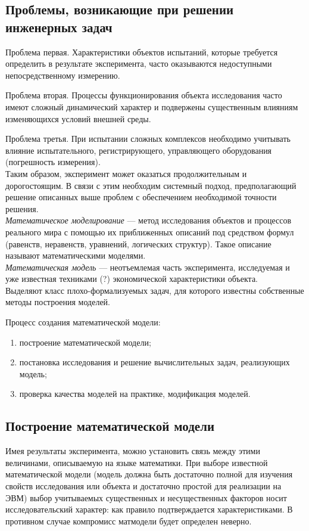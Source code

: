 \documentclass[12pt]{article}
\begin{document}
\subsection{Проблемы, возникающие при решении инженерных задач}
Проблема первая. Характеристики объектов испытаний, которые требуется определить в результате эксперимента, часто оказываются недоступными непосредственному измерению.

Проблема вторая. Процессы функционирования объекта исследования часто имеют сложный динамический характер и подвержены существенным влияниям изменяющихся условий внешней среды.

Проблема третья. При испытании сложных комплексов необходимо учитывать влияние испытательного, регистрирующего, управляющего оборудования (погрешность измерения).\\

Таким образом, эксперимент может оказаться продолжительным и дорогостоящим. В связи с этим необходим системный подход, предполагающий решение описанных выше проблем с обеспечением необходимой точности решения.\\

\emph{Математическое моделирование} --- метод исследования объектов и процессов реального мира с помощью их приближенных описаний под средством формул (равенств, неравенств, уравнений, логических структур). Такое описание называют математическими моделями.\\

\emph{Математическая модель} --- неотъемлемая часть эксперимента, исследуемая и уже известная техниками (?)  экономической характеристики объекта.\\

Выделяют класс плохо-формализуемых задач, для которого известны собственные методы построения моделей.

Процесс создания математической модели:
\begin{enumerate}
    \item построение математической модели;
    \item постановка исследования и решение вычислительных задач, реализующих модель;
    \item проверка качества моделей на практике, модификация моделей.
\end{enumerate}

\subsection{Построение математической модели}
Имея результаты эксперимента, можно установить связь между этими величинами, описываемую на языке математики. При выборе известной математической модели (модель должна быть достаточно полной для изучения свойств исследования или объекта и достаточно простой для реализации на ЭВМ) выбор учитываемых существенных и несущественных факторов носит исследовательский характер: как правило подтверждается характеристиками. В противном случае компромисс матмодели будет определен неверно.
\end{document}
